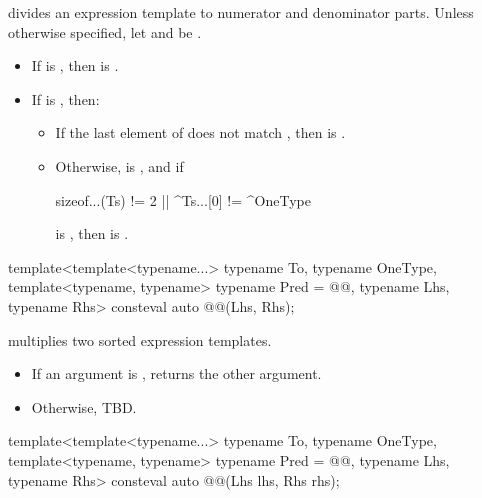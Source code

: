 \pnum
{} divides an expression template to numerator and denominator parts.
Unless otherwise specified, let  and  be .
\begin{itemize}
\item
If  is , then  is .
\item
If  is , then:
\begin{itemize}
\item
If the last element of  does not match ,
then  is .
\item
Otherwise,  is , and if
\begin{codeblock}
sizeof...(Ts) != 2 || ^Ts...[0] != ^OneType
\end{codeblock}
is , then
 is .
\end{itemize}
\end{itemize}

\begin{itemdecl}
template<template<typename...> typename To, typename OneType,
         template<typename, typename> typename Pred = @@, typename Lhs, typename Rhs>
consteval auto @@(Lhs, Rhs);
\end{itemdecl}

\begin{itemdescr}
\pnum
{} multiplies two sorted expression templates.

\pnum
\returns
\begin{itemize}
\item
If an argument is , returns the other argument.
\item
Otherwise,
TBD.
\end{itemize}
\end{itemdescr}

\begin{itemdecl}
template<template<typename...> typename To, typename OneType,
         template<typename, typename> typename Pred = @@, typename Lhs, typename Rhs>
consteval auto @@(Lhs lhs, Rhs rhs);
\end{itemdecl}

